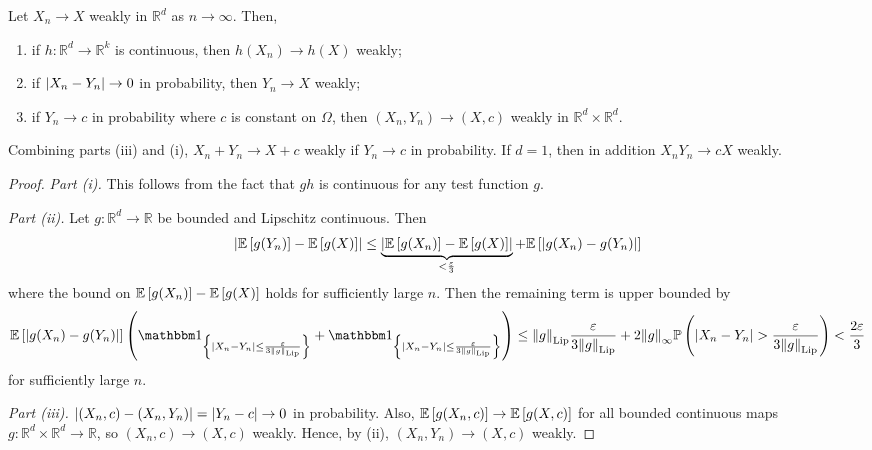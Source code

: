 \begin{proposition}
	Let \( X_n \to X \) weakly in \( \mathbb R^d \) as \( n \to \infty \).
	Then,
	\begin{enumerate}
		\item if \( h \colon \mathbb R^d \to \mathbb R^k \) is continuous, then \( h(X_n) \to h(X) \) weakly;
		\item if \( \abs{X_n - Y_n} \to 0 \) in probability, then \( Y_n \to X \) weakly;
		\item if \( Y_n \to c \) in probability where \( c \) is constant on \( \Omega \), then \( (X_n, Y_n) \to (X, c) \) weakly in \( \mathbb R^d \times \mathbb R^d \).
	\end{enumerate}
\end{proposition}
\begin{remark}
	Combining parts (iii) and (i), \( X_n + Y_n \to X + c \) weakly if \( Y_n \to c \) in probability.
	If \( d = 1 \), then in addition \( X_n Y_n \to c X \) weakly.
\end{remark}
\begin{proof}
	\emph{Part (i).}
	This follows from the fact that \( gh \) is continuous for any test function \( g \).

	\emph{Part (ii).}
	Let \( g \colon \mathbb R^d \to \mathbb R \) be bounded and Lipschitz continuous.
	Then
	\[ \abs{\mathbb{E}\left[{g(Y_n)}\right] - \mathbb{E}\left[{g(X)}\right]} \leq \underbrace{\abs{\mathbb{E}\left[{g(X_n)}\right] - \mathbb{E}\left[{g(X)}\right]}}_{< \frac{\varepsilon}{3}} + \mathbb{E}\left[{\abs{g(X_n) - g(Y_n)}}\right] \]
	where the bound on \( \mathbb{E}\left[{g(X_n)}\right] - \mathbb{E}\left[{g(X)}\right] \) holds for sufficiently large \( n \).
	Then the remaining term is upper bounded by
	\[ \expect{\abs{g(X_n) - g(Y_n)}} \qty(\mathbbm 1_{\qty{\abs{X_n - Y_n} \leq \frac{\varepsilon}{3\norm{g}_{\mathrm{Lip}}}}} + \mathbbm 1_{\qty{\abs{X_n - Y_n} \leq \frac{\varepsilon}{3\norm{g}_{\mathrm{Lip}}}}} ) \leq \norm{g}_{\mathrm{Lip}} \frac{\varepsilon}{3\norm{g}_{\mathrm{Lip}}} + 2\norm{g}_\infty \prob{\abs{X_n - Y_n} > \frac{\varepsilon}{3\norm{g}_{\mathrm{Lip}}}} < \frac{2\varepsilon}{3} \]
	for sufficiently large \( n \).

	\emph{Part (iii).}
	\( \abs{(X_n, c) - (X_n, Y_n)} = \abs{Y_n - c} \to 0 \) in probability.
	Also, \( \mathbb{E}\left[{g(X_n, c)}\right] \to \mathbb{E}\left[{g(X, c)}\right] \) for all bounded continuous maps \( g \colon \mathbb R^d \times \mathbb R^d \to \mathbb R \), so \( (X_n, c) \to (X, c) \) weakly.
	Hence, by (ii), \( (X_n, Y_n) \to (X, c) \) weakly.
\end{proof}

